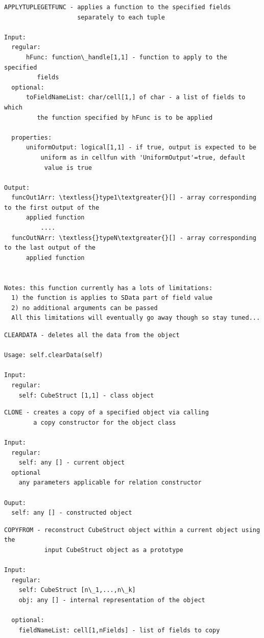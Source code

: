 \documentclass[letterpaper,10pt,english]{sphinxmanual}
\begin{document}
\begin{Verbatim}[commandchars=\\\{\}]
APPLYTUPLEGETFUNC - applies a function to the specified fields
                    separately to each tuple

Input:
  regular:
      hFunc: function\_handle[1,1] - function to apply to the specified
         fields
  optional:
      toFieldNameList: char/cell[1,] of char - a list of fields to which
         the function specified by hFunc is to be applied

  properties:
      uniformOutput: logical[1,1] - if true, output is expected to be
          uniform as in cellfun with 'UniformOutput'=true, default
           value is true

Output:
  funcOut1Arr: \textless{}type1\textgreater{}[] - array corresponding to the first output of the
      applied function
          ....
  funcOutNArr: \textless{}typeN\textgreater{}[] - array corresponding to the last output of the
      applied function


Notes: this function currently has a lots of limitations:
  1) the function is applies to SData part of field value
  2) no additional arguments can be passed
  All this limitations will eventually go away though so stay tuned...
\end{Verbatim}

\begin{Verbatim}[commandchars=\\\{\}]
CLEARDATA - deletes all the data from the object

Usage: self.clearData(self)

Input:
  regular:
    self: CubeStruct [1,1] - class object
\end{Verbatim}

\begin{Verbatim}[commandchars=\\\{\}]
CLONE - creates a copy of a specified object via calling
        a copy constructor for the object class

Input:
  regular:
    self: any [] - current object
  optional
    any parameters applicable for relation constructor

Ouput:
  self: any [] - constructed object
\end{Verbatim}

\begin{Verbatim}[commandchars=\\\{\}]
COPYFROM - reconstruct CubeStruct object within a current object using the
           input CubeStruct object as a prototype

Input:
  regular:
    self: CubeStruct [n\_1,...,n\_k]
    obj: any [] - internal representation of the object

  optional:
    fieldNameList: cell[1,nFields] - list of fields to copy
\end{Verbatim}
\end{document}
